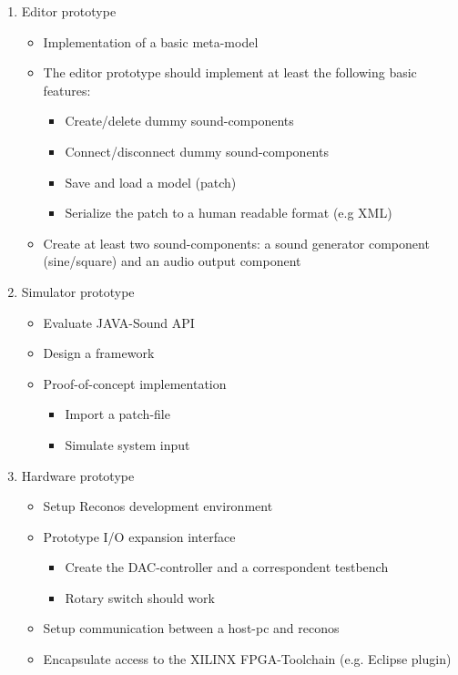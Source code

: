 \begin{enumerate}
	\item Editor prototype
		\begin{itemize}
			\item Implementation of a basic meta-model
			\item The editor prototype should implement at least the following basic features:
				\begin{itemize}
					\item Create/delete dummy sound-components
					\item Connect/disconnect dummy sound-components
					\item Save and load a model (patch)
					\item Serialize the patch to a human readable format (e.g XML)
				\end{itemize}
			\item Create at least two sound-components: a sound generator component (sine/square) and an audio output component
		\end{itemize}
	\item Simulator prototype
		\begin{itemize}
			\item Evaluate JAVA-Sound API
			\item Design a framework
			\item Proof-of-concept implementation
			\begin{itemize}
				\item Import a patch-file
				\item Simulate system input
			\end{itemize}
		\end{itemize}
	\item Hardware prototype
		\begin{itemize}
			\item Setup Reconos development environment
			\item Prototype I/O expansion interface
			\begin{itemize}
				\item Create the DAC-controller and a correspondent testbench
				\item Rotary switch should work
			\end{itemize}
			\item Setup communication between a host-pc and reconos
			\item Encapsulate access to the XILINX FPGA-Toolchain (e.g. Eclipse plugin)
		\end{itemize}
\end{enumerate}



